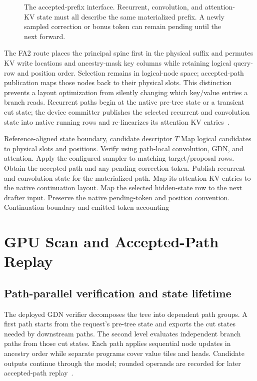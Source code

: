 \documentclass[conference]{IEEEtran}
\begin{document}
\begin{figure}[t]
\centering

\caption{The accepted-prefix interface. Recurrent, convolution, and attention-KV state must all describe the same materialized prefix. A newly sampled correction or bonus token can remain pending until the next forward.}
\label{fig:contract}
\end{figure}

The FA2 route places the principal spine first in the physical suffix and permutes KV write locations and ancestry-mask key columns while retaining logical query-row and position order. Selection remains in logical-node space; accepted-path publication maps those nodes back to their physical slots. This distinction prevents a layout optimization from silently changing which key/value entries a branch reads. Recurrent paths begin at the native pre-tree state or a transient cut state; the device committer publishes the selected recurrent and convolution state into native running rows and re-linearizes its attention KV entries~\cite{lumo2026archive,lumo2026stateless}.

\begin{algorithm}[t]
\caption{Logical verifier and continuation boundary}
\label{alg:verify}
\begin{algorithmic}[1]
\REQUIRE Reference-aligned state boundary, candidate descriptor $T$
\STATE Map logical candidates to physical slots and positions.
\STATE Verify using path-local convolution, GDN, and attention.
\STATE Apply the configured sampler to matching target/proposal rows.
\STATE Obtain the accepted path and any pending correction token.
\STATE Publish recurrent and convolution state for the materialized path.
\STATE Map its attention KV entries to the native continuation layout.
\STATE Map the selected hidden-state row to the next drafter input.
\STATE Preserve the native pending-token and position convention.
\RETURN Continuation boundary and emitted-token accounting
\end{algorithmic}
\end{algorithm}

\section{GPU Scan and Accepted-Path Replay}
\label{sec:kernel}
\subsection{Path-parallel verification and state lifetime}
The deployed GDN verifier decomposes the tree into dependent path groups. A first path starts from the request's pre-tree state and exports the cut states needed by downstream paths. The second level evaluates independent branch paths from those cut states. Each path applies sequential node updates in ancestry order while separate programs cover value tiles and heads. Candidate outputs continue through the model; rounded operands are recorded for later accepted-path replay~\cite{lumo2026archive}.
\end{document}
